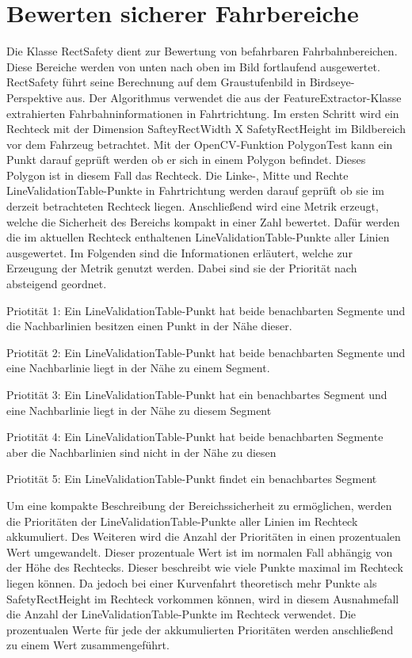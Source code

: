 %

\chapter{Bewerten sicherer Fahrbereiche}
\label{cha:Bewerten sicherer Fahrbereiche} 
%
%
Die Klasse RectSafety dient zur Bewertung von befahrbaren Fahrbahnbereichen.
Diese Bereiche werden von unten nach oben im Bild fortlaufend ausgewertet.
RectSafety f{\"u}hrt seine Berechnung auf dem Graustufenbild in Birdseye-Perspektive aus.
Der Algorithmus verwendet die aus der FeatureExtractor-Klasse extrahierten Fahrbahninformationen in Fahrtrichtung.
Im ersten Schritt wird ein Rechteck mit der Dimension SafteyRectWidth X SafetyRectHeight im Bildbereich vor dem Fahrzeug betrachtet.
Mit der OpenCV-Funktion PolygonTest kann ein Punkt darauf gepr{\"u}ft werden ob er sich in einem Polygon befindet. Dieses Polygon ist in diesem Fall das Rechteck. Die Linke-, Mitte und Rechte LineValidationTable-Punkte in Fahrtrichtung werden darauf gepr{\"u}ft ob sie im derzeit betrachteten Rechteck liegen. Anschlie{\ss}end wird eine Metrik erzeugt, welche die Sicherheit des Bereichs kompakt in einer Zahl bewertet. Daf{\"u}r werden die im aktuellen Rechteck enthaltenen LineValidationTable-Punkte aller Linien ausgewertet. Im Folgenden sind die Informationen erl{\"a}utert, welche zur Erzeugung der Metrik genutzt werden. Dabei sind sie der Priorit{\"a}t nach absteigend geordnet.

Priotit{\"a}t 1: Ein LineValidationTable-Punkt hat beide benachbarten Segmente und die Nachbarlinien besitzen einen Punkt in der N{\"a}he dieser.

Priotit{\"a}t 2: Ein LineValidationTable-Punkt hat beide benachbarten Segmente und eine Nachbarlinie liegt in der N{\"a}he zu einem Segment.

Priotit{\"a}t 3: Ein LineValidationTable-Punkt hat ein benachbartes Segment und eine Nachbarlinie liegt in der N{\"a}he zu diesem Segment

Priotit{\"a}t 4: Ein LineValidationTable-Punkt hat beide benachbarten Segmente aber die Nachbarlinien sind nicht in der N{\"a}he zu diesen

Priotit{\"a}t 5: Ein LineValidationTable-Punkt findet ein benachbartes Segment

Um eine kompakte Beschreibung der Bereichssicherheit zu erm{\"o}glichen, werden die Priorit{\"a}ten der LineValidationTable-Punkte aller Linien im Rechteck akkumuliert. Des Weiteren wird die Anzahl der Priorit{\"a}ten in einen prozentualen Wert umgewandelt. Dieser prozentuale Wert ist im normalen Fall abh{\"a}ngig von der H{\"o}he des Rechtecks. Dieser beschreibt wie viele Punkte maximal im Rechteck liegen k{\"o}nnen. Da jedoch bei einer Kurvenfahrt theoretisch mehr Punkte als SafetyRectHeight im Rechteck vorkommen k{\"o}nnen, wird in diesem Ausnahmefall die Anzahl der LineValidationTable-Punkte im Rechteck verwendet. Die prozentualen Werte f{\"u}r jede der akkumulierten Priorit{\"a}ten werden anschlie{\ss}end zu einem Wert zusammengef{\"u}hrt.

